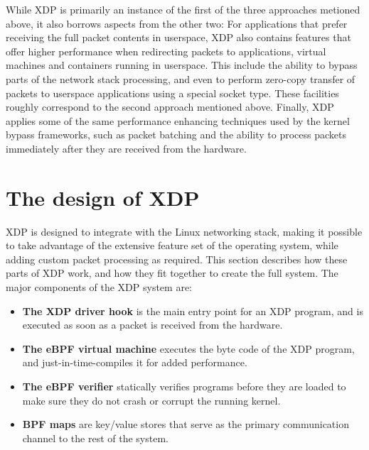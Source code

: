 \documentclass[10pt,sigconf]{acmart}
\begin{document}
While XDP is primarily an instance of the first of the three approaches metioned
above, it also borrows aspects from the other two: For applications that prefer
receiving the full packet contents in userspace, XDP also contains features that
offer higher performance when redirecting packets to applications, virtual
machines and containers running in userspace. This include the ability to bypass
parts of the network stack processing, and even to perform zero-copy transfer of
packets to userspace applications using a special socket type. These facilities
roughly correspond to the second approach mentioned above. Finally, XDP applies
some of the same performance enhancing techniques used by the kernel bypass
frameworks, such as packet batching and the ability to process packets
immediately after they are received from the hardware.

\section{The design of XDP}
\label{sec:design}
XDP is designed to integrate with the Linux networking stack, making it possible
to take advantage of the extensive feature set of the operating system, while
adding custom packet processing as required. This section describes how these
parts of XDP work, and how they fit together to create the full system. The
major components of the XDP system are:

\begin{itemize}
\item \textbf{The XDP driver hook} is the main entry point for an XDP program,
  and is executed as soon as a packet is received from the hardware.

\item \textbf{The eBPF virtual machine} executes the byte code of the XDP
  program, and just-in-time-compiles it for added performance.

\item \textbf{The eBPF verifier} statically verifies programs before they are
  loaded to make sure they do not crash or corrupt the running kernel.

\item \textbf{BPF maps} are key/value stores that serve as the primary
  communication channel to the rest of the system.
\end{itemize}
\end{document}
